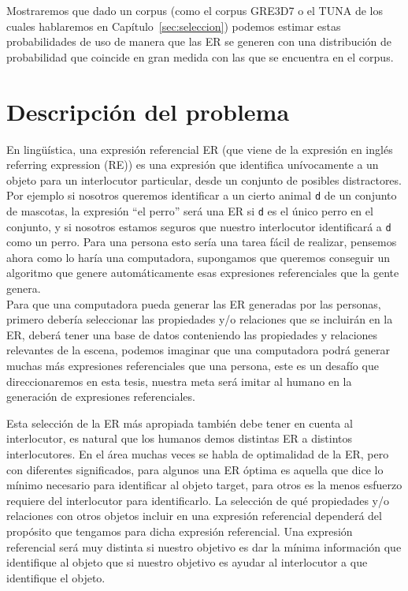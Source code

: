 Mostraremos que dado un corpus (como el corpus GRE3D7 o el TUNA de los cuales hablaremos en Cap\'itulo~\ref{sec:seleccion}) podemos estimar estas probabilidades de uso de manera que las ER se generen con una distribuci\'on de probabilidad que coincide en gran medida con las que se encuentra en el corpus.




\section{Descripci\'on del problema}
\label{sec:problema}

En ling\"u\'{i}stica, una expresi\'on referencial ER (que viene de la expresi\'on en ingl\'es referring expression (RE)) es una expresi\'on que identifica un\'ivocamente a un objeto para un interlocutor particular, desde un conjunto de posibles distractores. Por ejemplo si nosotros queremos identificar a un cierto animal \texttt{d} de un conjunto de mascotas, la expresi\'on ``el perro'' ser\'a una ER si \texttt{d} es el \'unico perro en el conjunto, y si nosotros estamos seguros que nuestro interlocutor identificar\'a a \texttt{d} como un perro. Para una persona esto ser\'ia una tarea f\'acil de realizar, pensemos ahora como lo har\'ia una computadora, supongamos que queremos conseguir un algoritmo que genere autom\'aticamente esas expresiones referenciales que la gente genera.\\



 Para que una computadora pueda generar las ER generadas por las personas, primero deber\'ia seleccionar las propiedades y/o relaciones que se incluir\'an en la ER, deber\'a tener una base de datos conteniendo las propiedades y relaciones relevantes de la escena, podemos imaginar que una computadora podr\'a generar muchas m\'as expresiones referenciales que una persona, este es un desaf\'io que direccionaremos en esta tesis, nuestra meta ser\'a imitar al humano en la generaci\'on de expresiones referenciales. 

Esta selecci\'on de la ER m\'as apropiada tambi\'en debe tener en cuenta al interlocutor, es natural que los humanos demos distintas ER a distintos interlocutores. En el \'area muchas veces se habla de optimalidad de la ER, pero con diferentes significados, para algunos una ER \'optima es aquella que dice lo m\'inimo necesario para identificar al objeto target, para otros es la menos esfuerzo requiere del interlocutor para identificarlo.
La selecci\'on de qu\'e propiedades y/o relaciones con otros objetos incluir en una expresi\'on referencial depender\'a del prop\'osito que tengamos para dicha expresi\'on referencial. Una expresi\'on referencial ser\'a muy distinta si nuestro objetivo es dar la m\'inima informaci\'on que identifique al objeto que si nuestro objetivo es ayudar al interlocutor a que identifique el objeto.

